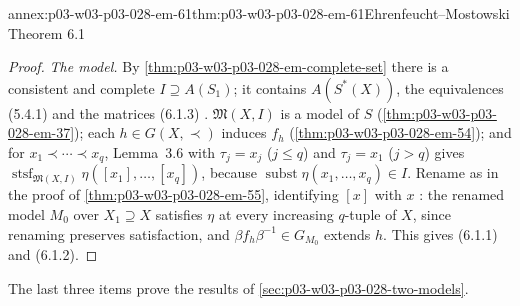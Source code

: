 \begin{annexitem}{annex:p03-w03-p03-028-em-61}{thm:p03-w03-p03-028-em-61}{Ehrenfeucht--Mostowski Theorem 6.1}
\begin{proof}
\emph{The model.}  By \cref{thm:p03-w03-p03-028-em-complete-set} there is a
consistent and complete \(I\supseteq A(S_1)\); it contains \(A(S^*(X))\), the
equivalences (5.4.1) and the matrices (6.1.3)
\cite[pp.~67--68]{EhrenfeuchtMostowski1956}.  \(\mathfrak M(X,I)\) is a model of
\(S\) (\cref{thm:p03-w03-p03-028-em-37}); each \(h\in G(X,\prec)\) induces
\(f_h\) (\cref{thm:p03-w03-p03-028-em-54}); and for
\(x_1\prec\cdots\prec x_q\), Lemma~3.6 with \(\tau_j=x_j\) (\(j\leq q\)) and
\(\tau_j=x_1\) (\(j>q\)) gives
\(\operatorname{stsf}_{\mathfrak M(X,I)}\eta([x_1],\ldots,[x_q])\), because
\(\operatorname{subst}\eta(x_1,\ldots,x_q)\in I\).  Rename as in the proof of
\cref{thm:p03-w03-p03-028-em-55}, identifying \([x]\) with \(x\)
\cite[p.~68]{EhrenfeuchtMostowski1956}: the renamed model \(M_0\) over
\(X_1\supseteq X\) satisfies \(\eta\) at every increasing \(q\)-tuple of \(X\),
since renaming preserves satisfaction, and
\(\beta f_h\beta^{-1}\in G_{M_0}\) extends \(h\).  This gives (6.1.1) and
(6.1.2).
\end{proof}
\end{annexitem}

The last three items prove the results of
\cref{sec:p03-w03-p03-028-two-models}.

